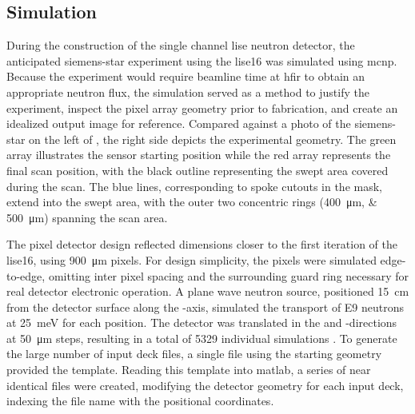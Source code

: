 \documentclass[../../../main.tex]{subfiles}
\begin{document}
%
    \subsection{Simulation}%
    \label{sec:chapter-3:imaging-techniques:simulation}%
    During the construction of the single channel \gls{lise} neutron detector, the anticipated \gls{siemens-star} experiment using the \gls{lise16} was simulated using \gls{mcnp}. 
    Because the experiment would require \gls{beamline} time at \gls{hfir} to obtain an appropriate neutron flux, the simulation served as a method to justify the experiment, inspect the pixel array geometry prior to fabrication, and create an idealized output image for reference. 
    Compared against a photo of the \gls{siemens-star} on the left of , the right side depicts the experimental geometry.
    The green array illustrates the sensor starting position while the red array represents the final scan position, with the black outline representing the swept area covered during the scan.
    The blue lines, corresponding to spoke cutouts in the  mask, extend into the swept area, with the outer two concentric rings (\SIlist{400; 500}{\micro\meter}) spanning the scan area.
    \par%
    The pixel detector design reflected dimensions closer to the first iteration of the \gls{lise16}, using \SI{900}{\micro\meter} pixels.
    For design simplicity, the pixels were simulated edge-to-edge, omitting inter pixel spacing and the surrounding guard ring necessary for real detector electronic operation.
    A plane wave neutron source, positioned \SI{15}{\centi\meter} from the detector surface along the -axis, simulated the transport of \num{E9} neutrons at \SI{25}{\milli\electronvolt} for each position.
    The detector was translated in the  and -directions at \SI{50}{\micro\meter} steps, resulting in a total of \num{5329} individual simulations \cite{Herrera_2016}.
    To generate the large number of input deck files, a single file using the starting geometry provided the template.
    Reading this template into \gls{matlab}, a series of near identical files were created, modifying the detector geometry for each input deck, indexing the file name with the positional coordinates.
\end{document}
